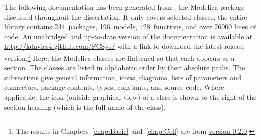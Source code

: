 
\newif\ifwideTables
\wideTablesfalse

\newif\ifwideTable
\wideTablefalse

\newif\ifinclDiagram
\inclDiagramtrue

\newif\ifinclModelica
\inclModelicatrue

\newif\ifinclParams
\inclParamstrue

\newif\ifinclConnectors
\inclConnectorstrue

\newif\ifinclTypes
\inclTypestrue

\newif\iffirstCallout
\firstCallouttrue



The following documentation has been generated from , the Modelica package discussed throughout the dissertation.  It only covers selected classes; the entire library contains 244~packages, 196~models, 428~functions, and over \num{26000} lines of code.  An unabridged and up-to-date version of the documentation is available at \url{http://kdavies4.github.com/FCSys/} with a link to download the latest release version.\footnote{The results in Chapters~\ref{chap:Basic} and~\ref{chap:Cell} are from \href{https://github.com/kdavies4/FCSys/archive/v0.2.0.zip}{version 0.2.0}.}  Here, the Modelica classes are flattened so that each appears as a section.  The classes are listed in alphabetic order by their absolute paths.  The subsections give general information, icons, diagrams, lists of parameters and connectors, package contents, types, constants, and source code.  Where applicable, the icon (outside graphical view) of a class is shown to the right of the section heading (which is the full name of the class).

